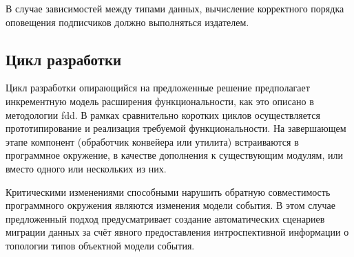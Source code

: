 В случае зависимостей между типами данных, вычисление корректного порядка
оповещения подписчиков должно выполняться издателем.

\subsection{Цикл разработки}

Цикл разработки опирающийся на предложенные решение предполагает
инкрементную модель расширения функциональности, как это описано
в методологии \acrshort{fdd}. В рамках сравнительно
коротких циклов
осуществляется прототипирование и реализация требуемой
функциональности. На завершающем этапе компонент (обработчик
конвейера или утилита) встраиваются в программное окружение,
в качестве дополнения к существующим модулям, или вместо одного или
нескольких из них.

Критическими изменениями способными нарушить обратную совместимость
программного окружения являются изменения модели события. В этом случае
предложенный подход предусматривает создание автоматических сценариев
миграции данных за счёт явного предоставления интроспективной информации о
топологии типов объектной модели события.


